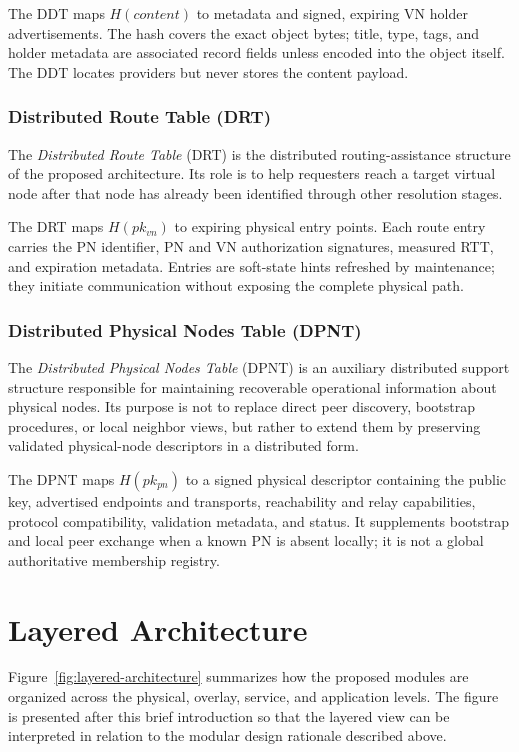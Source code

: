 \documentclass[
  12pt,
  oneside,
  a4paper,
  chapter=TITLE,
  section=TITLE,
  english,
  brazil
]{abntex2}
\begin{document}
The DDT maps $H(content)$ to metadata and signed, expiring VN holder advertisements. The hash covers the exact object bytes; title, type, tags, and holder metadata are associated record fields unless encoded into the object itself. The DDT locates providers but never stores the content payload.

\subsubsection{Distributed Route Table (DRT)}

The \textit{Distributed Route Table} (DRT) is the distributed routing-assistance structure of the proposed architecture. Its role is to help requesters reach a target virtual node after that node has already been identified through other resolution stages.

The DRT maps $H(pk_{vn})$ to expiring physical entry points. Each route entry carries the PN identifier, PN and VN authorization signatures, measured RTT, and expiration metadata. Entries are soft-state hints refreshed by maintenance; they initiate communication without exposing the complete physical path.

\subsubsection{Distributed Physical Nodes Table (DPNT)}

The \textit{Distributed Physical Nodes Table} (DPNT) is an auxiliary distributed support structure responsible for maintaining recoverable operational information about physical nodes. Its purpose is not to replace direct peer discovery, bootstrap procedures, or local neighbor views, but rather to extend them by preserving validated physical-node descriptors in a distributed form.

The DPNT maps $H(pk_{pn})$ to a signed physical descriptor containing the public key, advertised endpoints and transports, reachability and relay capabilities, protocol compatibility, validation metadata, and status. It supplements bootstrap and local peer exchange when a known PN is absent locally; it is not a global authoritative membership registry.



\section{Layered Architecture}

Figure~\ref{fig:layered-architecture} summarizes how the proposed modules are organized across the physical, overlay, service, and application levels. The figure is presented after this brief introduction so that the layered view can be interpreted in relation to the modular design rationale described above.
\end{document}
